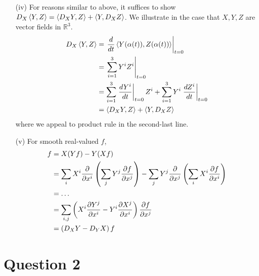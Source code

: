 \documentclass[12pt]{article}
\begin{document}
\begin{enumerate}
    \item[(iv)] For reasons similar to above, it suffices to show \(D_X \left\langle Y,Z\right\rangle = \left\langle D_X Y,Z\right\rangle + \left\langle Y, D_X Z\right\rangle\). We illustrate in the case that \(X,Y,Z\) are vector fields in \(\mathbb{R}^3\).
        \begin{align*}
            D_X \left\langle Y,Z\right\rangle &= \left. \frac{d}{dt}\left\langle Y(\alpha(t)), Z(\alpha(t))\right\rangle \right|_{t=0} \\
                            &= \left. \sum_{i=1}^3 Y^i Z^i \right|_{t=0} \\
                            &= \sum_{i=1}^3 \left.\frac{d Y^i}{dt} \right|_{t=0} Z^i
                            + \sum_{i=1}^3 Y^i \left.\frac{d Z^i}{dt} \right|_{t=0} \\
                            &= \left\langle D_X Y, Z\right\rangle + \left\langle Y,D_X Z\right\rangle
        \end{align*}
        where we appeal to product rule in the second-last line.
    \item[(v)] For smooth real-valued \(f\),
        \begin{align*}
            [X,Y]f &= X(Yf) - Y(Xf) \\
                   &= \sum_i X^i \pd{x^i} \left( \sum_j Y^j \pdd{f}{x^j} \right)
                    - \sum_j Y^j \pd{x^j} \left( \sum_i X^i \pdd{f}{x^i} \right) \\
                   &= \dots \\
                   &= \sum_{i,j} \left(X^i \pdd{Y^j}{x^i} - Y^i\pdd{X^j}{x^i}\right) \pdd{f}{x^j} \\
                   &= \left(D_X Y - D_Y X\right) f
        \end{align*}
\end{enumerate}

\section*{Question 2}
\end{document}
